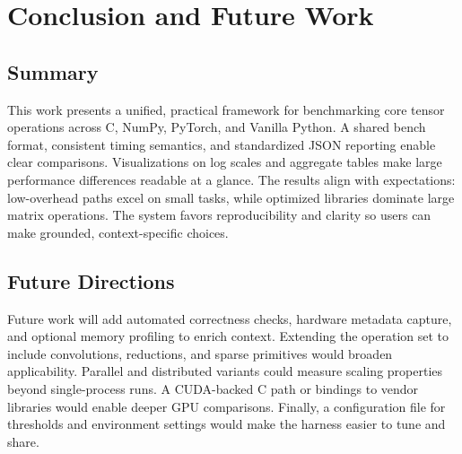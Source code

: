 \documentclass[a4paper,12pt]{article}
\begin{document}
\section{Conclusion and Future Work}
\subsection{Summary}
This work presents a unified, practical framework for benchmarking core tensor operations across C, NumPy, PyTorch, and Vanilla Python. A shared bench format, consistent timing semantics, and standardized JSON reporting enable clear comparisons. Visualizations on log scales and aggregate tables make large performance differences readable at a glance. The results align with expectations: low-overhead paths excel on small tasks, while optimized libraries dominate large matrix operations. The system favors reproducibility and clarity so users can make grounded, context-specific choices.

\subsection{Future Directions}
Future work will add automated correctness checks, hardware metadata capture, and optional memory profiling to enrich context. Extending the operation set to include convolutions, reductions, and sparse primitives would broaden applicability. Parallel and distributed variants could measure scaling properties beyond single-process runs. A CUDA-backed C path or bindings to vendor libraries would enable deeper GPU comparisons. Finally, a configuration file for thresholds and environment settings would make the harness easier to tune and share.
\end{document}
